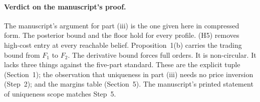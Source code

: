 \documentclass[12pt]{article}
\theoremstyle{remark}
\begin{document}
\paragraph{Verdict on the manuscript's proof.}
The manuscript's argument for part (iii) is the one given here in compressed form. The
posterior bound and the floor hold for every profile. (H5) removes high-cost entry at every
reachable belief. Proposition~1(b) carries the trading bound from $F_1$ to $F_2$. The derivative
bound forces full orders. It is non-circular. It lacks three things against the five-part
standard. These are the explicit tuple (Section~1); the observation that uniqueness in part
(iii) needs no price inversion (Step~2); and the margins table (Section~5). The manuscript's
printed statement of uniqueness scope matches Step~5.
\end{document}
